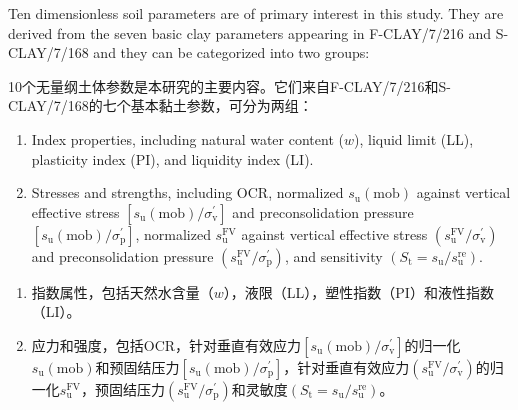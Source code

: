 \begin{ParaColumn}
    

    
    Ten dimensionless soil parameters are of primary interest in this study. They are derived from the seven basic clay parameters appearing in F-CLAY/7/216 and S-CLAY/7/168 and they can be categorized into two groups:

    \switchcolumn

    10个无量纲土体参数是本研究的主要内容。它们来自F-CLAY/7/216和S-CLAY/7/168的七个基本黏土参数，可分为两组：

    \switchcolumn*

    \begin{enumerate}
        \item Index properties, including natural water content ($w$), liquid limit (LL), plasticity index (PI), and liquidity index (LI).
        \item Stresses and strengths, including OCR, normalized $s_{\mathrm{u}}(\mathrm{mob})$ against vertical effective stress $\left[s_{\mathrm{u}}(\mathrm{mob}) / \sigma_{\mathrm{v}}^{\prime}\right]$ and preconsolidation pressure $\left[s_{\mathrm{u}}(\mathrm{mob}) / \sigma_{\mathrm{p}}^{\prime}\right]$, normalized $s_{\mathrm{u}}^{\mathrm{FV}}$ against vertical effective stress $\left(s_{\mathrm{u}}^{\mathrm{FV}} / \sigma_{\mathrm{v}}^{\prime}\right)$ and preconsolidation pressure $\left(s_{\mathrm{u}}^{\mathrm{FV}} / \sigma_{\mathrm{p}}^{\prime}\right)$, and sensitivity $\left(S_{\mathrm{t}}=s_{\mathrm{u}} / s_{\mathrm{u}}^{\mathrm{re}}\right)$.
    \end{enumerate}

    \switchcolumn

    \begin{enumerate}
        \item 指数属性，包括天然水含量（$w$），液限（LL），塑性指数（PI）和液性指数（LI）。
        \item 应力和强度，包括OCR，针对垂直有效应力$\left[s_{\mathrm{u}}(\mathrm{mob}) / \sigma_{\mathrm{v}}^{\prime}\right]$的归一化$s_{\mathrm{u}}(\mathrm{mob})$和预固结压力$\left[s_{\mathrm{u}}(\mathrm{mob}) / \sigma_{\mathrm{p}}^{\prime}\right]$，针对垂直有效应力$\left(s_{\mathrm{u}}^{\mathrm{FV}} / \sigma_{\mathrm{v}}^{\prime}\right)$的归一化$s_{\mathrm{u}}^{\mathrm{FV}}$，预固结压力$\left(s_{\mathrm{u}}^{\mathrm{FV}} / \sigma_{\mathrm{p}}^{\prime}\right)$和灵敏度$\left(S_{\mathrm{t}}=s_{\mathrm{u}} / s_{\mathrm{u}}^{\mathrm{re}}\right)$。
    \end{enumerate}


\end{ParaColumn}
